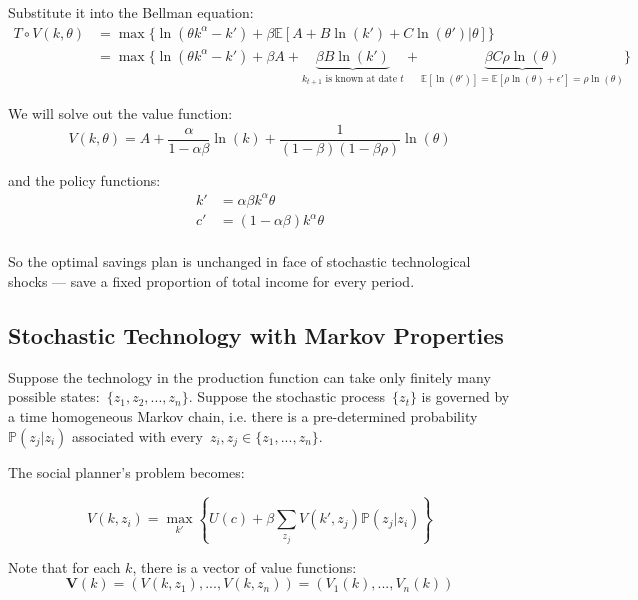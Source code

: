 \documentclass[10pt,a4]{article}
\begin{document}
Substitute it into the Bellman equation:
\[
   \begin{aligned}
     T \circ V(k,\theta) &= \max \{\ln(\theta k^{\alpha} - k') + \beta\mathbb{E}[A + B\ln(k') + C\ln(\theta')|\theta]\} \\
     &= \max \{\ln(\theta k^{\alpha} - k') + \beta A + \underbrace{\beta B\ln(k')}_{k_{t+1} \textrm{ is known at date } t} + \underbrace{\beta C\rho\ln(\theta)}_{\mathbb{E}[\ln(\theta')] = \mathbb{E}[\rho\ln(\theta)+\epsilon']=\rho\ln(\theta)} \}
   \end{aligned}
\]

We will solve out the value function:
$$ V(k,\theta) = A + \frac{\alpha}{1-\alpha\beta}\ln(k) + \frac{1}{(1-\beta)(1-\beta\rho)}\ln(\theta) $$

and the policy functions:
$$
    \begin{aligned}
        k' &= \alpha\beta k^{\alpha} \theta \\
        c' &= (1-\alpha\beta) k^{\alpha} \theta \\
    \end{aligned}
$$

So the optimal savings plan is unchanged in face of stochastic
technological shocks --- save a fixed proportion of total income for
every period.~

\par\null

\subsection{Stochastic Technology with Markov
Properties}

{\label{530082}}

Suppose the technology in the production function can take only finitely
many possible states:~\(\{z_1, z_2, ..., z_n\}\). Suppose the stochastic
process~\(\{z_t\}\) is governed by a time homogeneous Markov
chain, i.e. there is a pre-determined probability~\(\mathbb{P}(z_j|z_i)\)
associated with every~\(z_i, z_j \in \{z_1, ..., z_n \}\).~

The social planner's problem becomes:

$$ V(k, z_i) = \max_{k'}\left\{U(c) + \beta\sum_{z_j}V(k', z_j)\mathbb{P}(z_j|z_i)\right\} $$

Note that for each $k$, there is a vector of value functions:
$$ \mathbf{V}(k) = (V(k,z_1), ..., V(k,z_n)) = (V_1(k), ..., V_n(k)) $$
\end{document}
